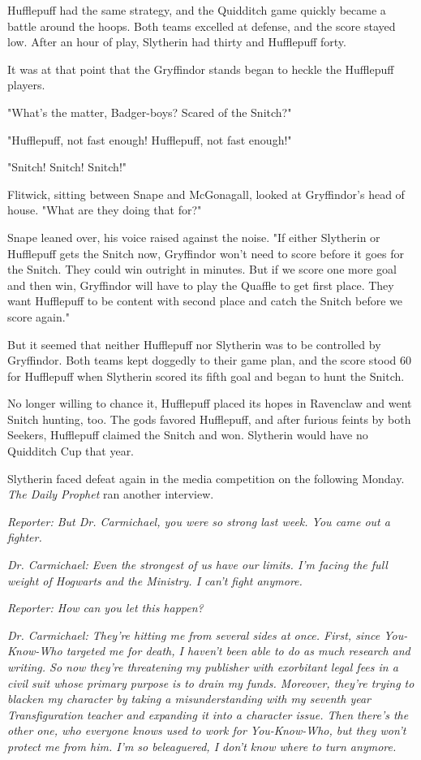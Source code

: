 \documentclass[a4paper,11pt]{article}
\begin{document}
Hufflepuff had the same strategy, and the Quidditch game quickly became a battle around the hoops. Both teams excelled at defense, and the score stayed low. After an hour of play, Slytherin had thirty and Hufflepuff forty.

It was at that point that the Gryffindor stands began to heckle the Hufflepuff players.

"What's the matter, Badger-boys? Scared of the Snitch?"

"Hufflepuff, not fast enough! Hufflepuff, not fast enough!"

"Snitch! Snitch! Snitch!"

Flitwick, sitting between Snape and McGonagall, looked at Gryffindor's head of house. "What are they doing that for?"

Snape leaned over, his voice raised against the noise. "If either Slytherin or Hufflepuff gets the Snitch now, Gryffindor won't need to score before it goes for the Snitch. They could win outright in minutes. But if we score one more goal and then win, Gryffindor will have to play the Quaffle to get first place. They want Hufflepuff to be content with second place and catch the Snitch before we score again."

But it seemed that neither Hufflepuff nor Slytherin was to be controlled by Gryffindor. Both teams kept doggedly to their game plan, and the score stood 60 for Hufflepuff when Slytherin scored its fifth goal and began to hunt the Snitch.

No longer willing to chance it, Hufflepuff placed its hopes in Ravenclaw and went Snitch hunting, too. The gods favored Hufflepuff, and after furious feints by both Seekers, Hufflepuff claimed the Snitch and won. Slytherin would have no Quidditch Cup that year.

Slytherin faced defeat again in the media competition on the following Monday. \emph{The Daily Prophet} ran another interview.

\emph{Reporter: But Dr. Carmichael, you were so strong last week. You came out a fighter.}

\emph{Dr. Carmichael: Even the strongest of us have our limits. I'm facing the full weight of Hogwarts and the Ministry. I can't fight anymore.}

\emph{Reporter: How can you let this happen?}

\emph{Dr. Carmichael: They're hitting me from several sides at once. First, since You-Know-Who targeted me for death, I haven't been able to do as much research and writing. So now they're threatening my publisher with exorbitant legal fees in a civil suit whose primary purpose is to drain my funds. Moreover, they're trying to blacken my character by taking a misunderstanding with my seventh year Transfiguration teacher and expanding it into a character issue. Then there's the other one, who everyone knows used to work for You-Know-Who, but they won't protect me from him. I'm so beleaguered, I don't know where to turn anymore.}
\end{document}
